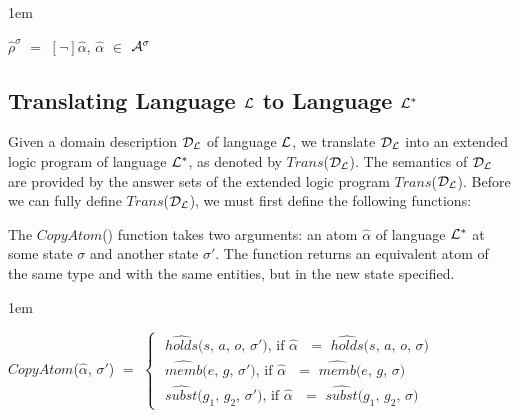 \documentclass[11pt]{report}
\newenvironment{vquote}
{
  \begin{list}{}{\leftmargin 1em}\item[]
}
{
  \end{list}
}
\begin{document}
          \begin{vquote}
            $\hat{\rho}^{\sigma}$ $=$
              $[\lnot]$$\hat{\alpha}$,
              $\hat{\alpha}$ $\in$ ${\cal A}^{\sigma}$
          \end{vquote}

      \subsection{Translating Language ${\cal L}$ to Language ${\cal L^{*}}$}
        \label{subs-langl-trans}

        Given a domain description ${\cal D_{L}}$ of language ${\cal L}$, we
        translate ${\cal D_{L}}$ into an extended logic program of language
        ${\cal L^{*}}$, as denoted by $Trans$(${\cal D_{L}}$). The semantics
        of ${\cal D_{L}}$ are provided by the answer sets of the extended
        logic program $Trans$(${\cal D_{L}}$). Before we can fully define
        $Trans$(${\cal D}_{\cal L}$), we must first define the following
        functions:

        The $CopyAtom$() function takes two arguments: an atom $\hat{\alpha}$
        of language ${\cal L}^{*}$ at some state $\sigma$ and another state
        $\sigma'$. The function returns an equivalent atom of the same type
        and with the same entities, but in the new state specified.

        \begin{vquote}
          $CopyAtom$($\hat{\alpha}$, $\sigma'$)
          $=$
          \begin{math}
            \begin{cases}
              \mbox{
                $\hat{holds}$($s$, $a$, $o$, $\sigma'$),
                  if $\hat{\alpha}$ $=$
                    $\hat{holds}$($s$, $a$, $o$, $\sigma$)
              } \\
              \mbox{
                $\hat{memb}$($e$, $g$, $\sigma'$),
                  if $\hat{\alpha}$ $=$
                    $\hat{memb}$($e$, $g$, $\sigma$)
              } \\
              \mbox{
                $\hat{subst}$($g_{1}$, $g_{2}$, $\sigma'$),
                  if $\hat{\alpha}$ $=$
                    $\hat{subst}$($g_{1}$, $g_{2}$, $\sigma$)
              }
            \end{cases}
          \end{math}
        \end{vquote}
\end{document}
